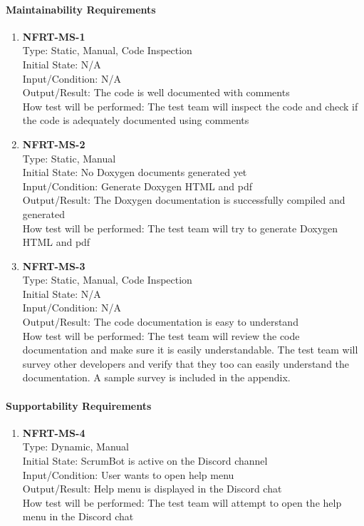 \documentclass[12pt, titlepage]{article}
\begin{document}
\paragraph{Maintainability Requirements}
\begin{enumerate}
    
    \item{\textbf{NFRT-MS-1}}\\
    Type: Static, Manual, Code Inspection\\
    Initial State: N/A\\
    Input/Condition: N/A\\
    Output/Result: The code is well documented with comments\\
    How test will be performed: The test team will inspect the code and check if the code is adequately documented using comments
    
    \item{\textbf{NFRT-MS-2}}\\
    Type: Static, Manual\\
    Initial State: No Doxygen documents generated yet\\
    Input/Condition: Generate Doxygen HTML and pdf\\
    Output/Result: The Doxygen documentation is successfully compiled and generated\\
    How test will be performed: The test team will try to generate Doxygen HTML and pdf
    
    \item{\textbf{NFRT-MS-3}}\\
    Type: Static, Manual, Code Inspection\\
    Initial State: N/A\\
    Input/Condition: N/A\\
    Output/Result: The code documentation is easy to understand\\
    How test will be performed: The test team will review the code documentation and make sure it is easily understandable. The test team will survey other developers and verify that they too can easily understand the documentation. A sample survey is included in the appendix.
\end{enumerate}

\paragraph{Supportability Requirements}
\begin{enumerate}
    \item{\textbf{NFRT-MS-4}}\\
    Type: Dynamic, Manual\\
    Initial State: ScrumBot is active on the Discord channel\\
    Input/Condition: User wants to open help menu\\
    Output/Result: Help menu is displayed in the Discord chat\\
    How test will be performed: The test team will attempt to open the help menu in the Discord chat

\end{enumerate}
\end{document}
